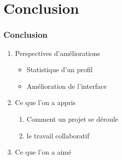 \documentclass[12pt]{beamer}
\begin{document}
\section{Conclusion}
    \begin{frame}
    \frametitle{Conclusion}
        
        \begin{enumerate}
            \item Perspectives d'améliorations
            \begin{itemize}
                \item Statistique d'un profil
                \item Amélioration de l'interface 
            \end{itemize}
            
            \item Ce que l'on a appris
            \begin{enumerate}
                \item Comment un projet se déroule
                \item le travail collaboratif
            \end{enumerate}
            
            \item Ce que l'on a aimé
            
         
        \end{enumerate}
    \end{frame}
    
\appendix[Questions ?]
\end{document}
